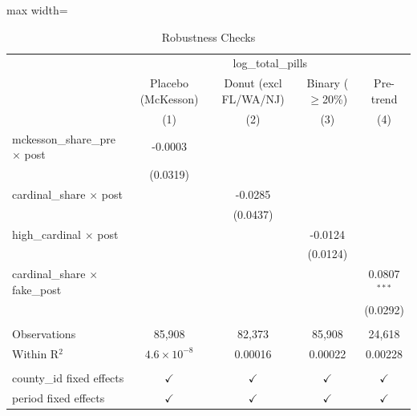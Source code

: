 
\begin{table}[htbp]
   \caption{\label{tab:robustness} Robustness Checks}
   \bigskip
   \centering
   \begin{adjustbox}{max width=\textwidth}
   \begin{tabular}{lcccc}
      \toprule
       & \multicolumn{4}{c}{log\_total\_pills}\\
                                             & Placebo (McKesson)   & Donut (excl FL/WA/NJ) & Binary ($\geq$20\%)   & Pre-trend \\   
                                             & (1)                  & (2)                   & (3)                   & (4)\\  
      \midrule 
      mckesson\_share\_pre $\times$ post     & -0.0003              &                       &                       &   \\   
                                             & (0.0319)             &                       &                       &   \\   
      cardinal\_share $\times$ post          &                      & -0.0285               &                       &   \\   
                                             &                      & (0.0437)              &                       &   \\   
      high\_cardinal $\times$ post           &                      &                       & -0.0124               &   \\   
                                             &                      &                       & (0.0124)              &   \\   
      cardinal\_share $\times$ fake\_post    &                      &                       &                       & 0.0807$^{***}$\\   
                                             &                      &                       &                       & (0.0292)\\   
       \\
      Observations                           & 85,908               & 82,373                & 85,908                & 24,618\\  
      Within R$^2$                           & $4.6\times 10^{-8}$  & 0.00016               & 0.00022               & 0.00228\\  
       \\
      county\_id fixed effects               & $\checkmark$         & $\checkmark$          & $\checkmark$          & $\checkmark$\\   
      period fixed effects                   & $\checkmark$         & $\checkmark$          & $\checkmark$          & $\checkmark$\\   
      \bottomrule
   \end{tabular}
   \end{adjustbox}
   

\end{table}
